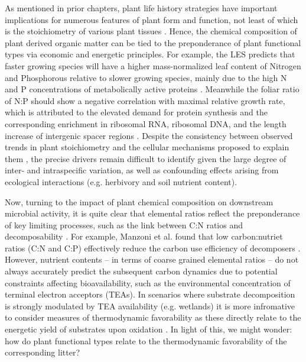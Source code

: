 
As mentioned in prior chapters, plant life history strategies have important implications for numerous features of plant form and function, not least of which is the stoichiometry of various plant tissues \cite{reich2014a,wright2004a}. Hence, the chemical composition of plant derived organic matter can be tied to the preponderance of plant functional types via economic and energetic principles. For example, the LES predicts that faster growing species will have a higher mass-normalized leaf content of Nitrogen and Phosphorous relative to slower growing species, mainly due to the high N and P concentrations of metabolically active proteins \cite{diaz_global_2016}. Meanwhile the foliar ratio of N:P should show a negative correlation with maximal relative growth rate, which is attributed to the elevated demand for protein synthesis and the corresponding enrichment in ribosomal RNA, ribosomal DNA, and the length increase of intergenic spacer regions \cite{gusewell_n_2004, elser_biological_2000}. Despite the consistency between observed trends in plant stoichiometry and the cellular mechanisms proposed to explain them , the precise drivers remain difficult to identify given the large degree of inter- and intraspecific variation, as well as confounding effects arising from ecological interactions (e.g. herbivory and soil nutrient content).


Now, turning to the impact of plant chemical composition on downstream microbial activity, it is quite clear that elemental ratios reflect the preponderance of key limiting processes, such as the link between C:N ratios and decomposability \cite{bakker_leaf_2011}. For example, Manzoni et al. found that low carbon:nutriet ratios (C:N and C:P) effectively reduce the carbon use efficiency of decomposers \cite{manzoni_stoichiometric_2010}. However, nutrient contents -- in terms of coarse grained elemental ratios -- do not always accurately predict the subsequent carbon dynamics due to potential constraints affecting bioavailability, such as the environmental concentration of terminal electron acceptors (TEAs). In scenarios where substrate decomposition is strongly modulated by TEA availability (e.g. wetlands) it is more infromative to consider measures of thermodynamic favorability as these directly relate to the energetic yield of substrates upon oxidation \cite{kleerebezem2010a,hough2022a}. In light of this, we might wonder: how do plant functional types relate to the thermodynamic favorability of the corresponding litter?

